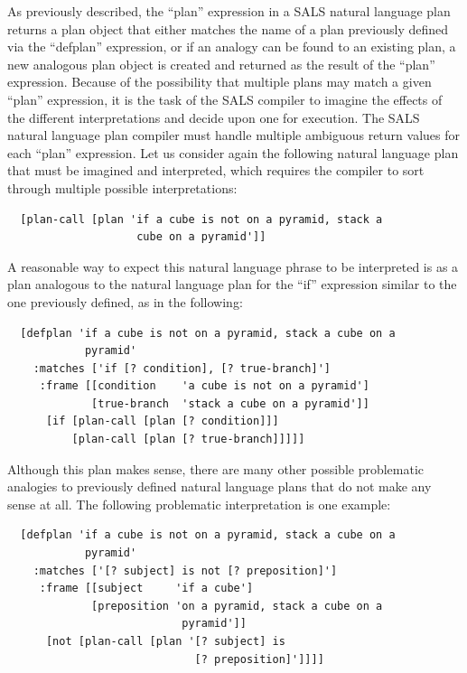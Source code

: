 As previously described, the ``plan'' expression in a SALS natural
language plan returns a plan object that either matches the name of a
plan previously defined via the ``defplan'' expression, or if an
analogy can be found to an existing plan, a new analogous plan object
is created and returned as the result of the ``plan'' expression.
Because of the possibility that multiple plans may match a given
``plan'' expression, it is the task of the SALS compiler to imagine
the effects of the different interpretations and decide upon one for
execution.  The SALS natural language plan compiler must handle
multiple ambiguous return values for each ``plan'' expression.  Let us
consider again the following natural language plan that must be
imagined and interpreted, which requires the compiler to sort through
multiple possible interpretations:
\begin{Verbatim}
  [plan-call [plan 'if a cube is not on a pyramid, stack a
                    cube on a pyramid']]
\end{Verbatim}
A reasonable way to expect this natural language phrase to
be interpreted is as a plan analogous to the natural language plan for
the ``if'' expression similar to the one previously defined, as in the
following:
\begin{samepage}
\begin{Verbatim}
  [defplan 'if a cube is not on a pyramid, stack a cube on a
            pyramid'
    :matches ['if [? condition], [? true-branch]']
     :frame [[condition    'a cube is not on a pyramid']
             [true-branch  'stack a cube on a pyramid']]
      [if [plan-call [plan [? condition]]]
          [plan-call [plan [? true-branch]]]]]
\end{Verbatim}
\end{samepage}
Although this plan makes sense, there are many other possible
problematic analogies to previously defined natural language plans
that do not make any sense at all.  The following problematic
interpretation is one example:
\begin{samepage}
\begin{Verbatim}
  [defplan 'if a cube is not on a pyramid, stack a cube on a
            pyramid'
    :matches ['[? subject] is not [? preposition]']
     :frame [[subject     'if a cube']
             [preposition 'on a pyramid, stack a cube on a
                           pyramid']]
      [not [plan-call [plan '[? subject] is
                             [? preposition]']]]]
\end{Verbatim}
\end{samepage}
